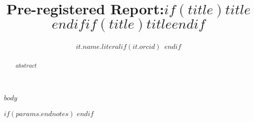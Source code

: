 \documentclass[biblatex,$nonblind$]{C:/Users/damon/Dropbox/templates/manuscripts/apsr_submission}
\title{Pre-registered Report:$if(title)$$title$$endif$}
\title{$if(title)$$title$$endif$}
\author{$it.name.literal$$if(it.orcid)$~\orcidlink{$it.orcid$}$endif$}
        {$for(it.affiliations)$$it.name$$endfor$}
        {$if(it.attributes.corresponding)${Corresponding author. Email: \url{$it.email$} \\}$endif$$if(repo)${Replication materials: \url{$repo$}}$endif$}
\begin{document}
\begin{frontmatter}
\begin{abstract}
    $abstract$
\end{abstract}
\end{frontmatter}
\setcounter{page}{0}
\thispagestyle{empty}
\newpage

$body$

\newpage
\printbibliography
$if(params.endnotes)$
\newpage
\theendnotes
$endif$
\end{document}
